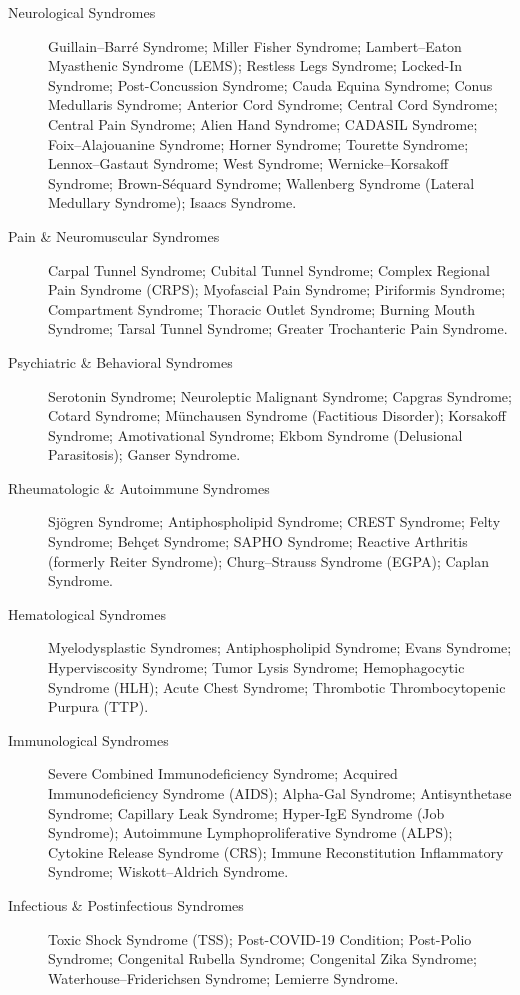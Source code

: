 \begin{description}
\item[Neurological Syndromes] Guillain–Barré Syndrome; Miller Fisher Syndrome; Lambert–Eaton Myasthenic Syndrome (LEMS); Restless Legs Syndrome; Locked-In Syndrome; Post-Concussion Syndrome; Cauda Equina Syndrome; Conus Medullaris Syndrome; Anterior Cord Syndrome; Central Cord Syndrome; Central Pain Syndrome; Alien Hand Syndrome; CADASIL Syndrome; Foix–Alajouanine Syndrome; Horner Syndrome; Tourette Syndrome; Lennox–Gastaut Syndrome; West Syndrome; Wernicke–Korsakoff Syndrome; Brown-Séquard Syndrome; Wallenberg Syndrome (Lateral Medullary Syndrome); Isaacs Syndrome.

\item[Pain \& Neuromuscular Syndromes] Carpal Tunnel Syndrome; Cubital Tunnel Syndrome; Complex Regional Pain Syndrome (CRPS); Myofascial Pain Syndrome; Piriformis Syndrome; Compartment Syndrome; Thoracic Outlet Syndrome; Burning Mouth Syndrome; Tarsal Tunnel Syndrome; Greater Trochanteric Pain Syndrome.

\item[Psychiatric \& Behavioral Syndromes] Serotonin Syndrome; Neuroleptic Malignant Syndrome; Capgras Syndrome; Cotard Syndrome; Münchausen Syndrome (Factitious Disorder); Korsakoff Syndrome; Amotivational Syndrome; Ekbom Syndrome (Delusional Parasitosis); Ganser Syndrome.

\item[Rheumatologic \& Autoimmune Syndromes] Sjögren Syndrome; Antiphospholipid Syndrome; CREST Syndrome; Felty Syndrome; Behçet Syndrome; SAPHO Syndrome; Reactive Arthritis (formerly Reiter Syndrome); Churg–Strauss Syndrome (EGPA); Caplan Syndrome.

\item[Hematological Syndromes] Myelodysplastic Syndromes; Antiphospholipid Syndrome; Evans Syndrome; Hyperviscosity Syndrome; Tumor Lysis Syndrome; Hemophagocytic Syndrome (HLH); Acute Chest Syndrome; Thrombotic Thrombocytopenic Purpura (TTP).

\item[Immunological Syndromes] Severe Combined Immunodeficiency Syndrome; Acquired Immunodeficiency Syndrome (AIDS); Alpha-Gal Syndrome; Antisynthetase Syndrome; Capillary Leak Syndrome; Hyper-IgE Syndrome (Job Syndrome); Autoimmune Lymphoproliferative Syndrome (ALPS); Cytokine Release Syndrome (CRS); Immune Reconstitution Inflammatory Syndrome; Wiskott–Aldrich Syndrome.

\item[Infectious \& Postinfectious Syndromes] Toxic Shock Syndrome (TSS); Post-COVID-19 Condition; Post-Polio Syndrome; Congenital Rubella Syndrome; Congenital Zika Syndrome; Waterhouse–Friderichsen Syndrome; Lemierre Syndrome.


\end{description}
